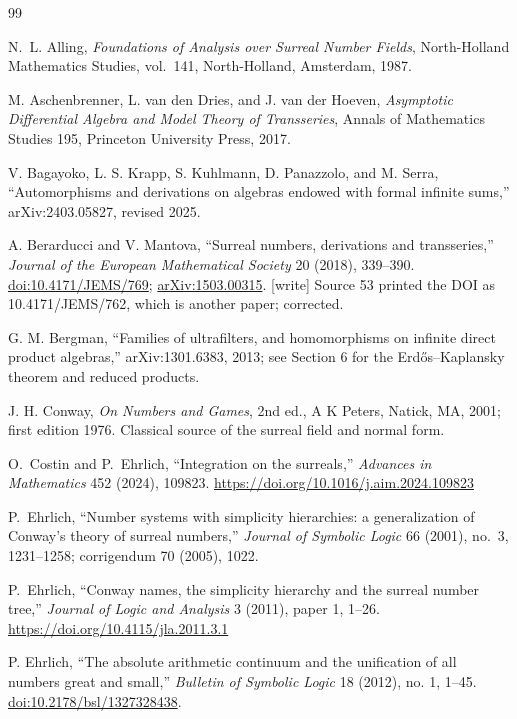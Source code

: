 \documentclass[11pt,letterpaper]{article}
\numberwithin{equation}{section}
\theoremstyle{definition}
\theoremstyle{remark}
\newcommand{\wtag}{\textup{[write]}}%
\begin{document}
\clearpage
\begin{thebibliography}{99}
\raggedright

N.~L. Alling,
\emph{Foundations of Analysis over Surreal Number Fields},
North-Holland Mathematics Studies, vol.~141, North-Holland, Amsterdam, 1987.

M. Aschenbrenner, L. van den Dries, and J. van der Hoeven,
\emph{Asymptotic Differential Algebra and Model Theory of Transseries},
Annals of Mathematics Studies 195, Princeton University Press, 2017.

V. Bagayoko, L. S. Krapp, S. Kuhlmann, D. Panazzolo, and M. Serra,
``Automorphisms and derivations on algebras endowed with formal infinite
sums,'' arXiv:2403.05827, revised 2025.

A. Berarducci and V. Mantova,
``Surreal numbers, derivations and transseries,''
\emph{Journal of the European Mathematical Society} 20 (2018), 339--390.
\href{https://doi.org/10.4171/JEMS/769}{doi:10.4171/JEMS/769};
\href{https://arxiv.org/abs/1503.00315}{arXiv:1503.00315}.
\wtag{} Source 53 printed the DOI as 10.4171/JEMS/762, which is another
paper; corrected.

G. M. Bergman,
``Families of ultrafilters, and homomorphisms on infinite direct product
algebras,'' arXiv:1301.6383, 2013; see Section 6 for the
Erd\H{o}s--Kaplansky theorem and reduced products.

J. H. Conway,
\emph{On Numbers and Games}, 2nd ed., A K Peters, Natick, MA, 2001; first
edition 1976.  Classical source of the surreal field and normal form.

O.~Costin and P.~Ehrlich,
``Integration on the surreals,''
\emph{Advances in Mathematics} 452 (2024), 109823.
\url{https://doi.org/10.1016/j.aim.2024.109823}

P.~Ehrlich,
``Number systems with simplicity hierarchies: a generalization of Conway's
theory of surreal numbers,''
\emph{Journal of Symbolic Logic} 66 (2001), no.~3, 1231--1258;
corrigendum 70 (2005), 1022.

P.~Ehrlich,
``Conway names, the simplicity hierarchy and the surreal number tree,''
\emph{Journal of Logic and Analysis} 3 (2011), paper 1, 1--26.
\url{https://doi.org/10.4115/jla.2011.3.1}

P. Ehrlich,
``The absolute arithmetic continuum and the unification of all numbers great
and small,'' \emph{Bulletin of Symbolic Logic} 18 (2012), no. 1, 1--45.
\href{https://doi.org/10.2178/bsl/1327328438}{doi:10.2178/bsl/1327328438}.


\end{thebibliography}
\end{document}
